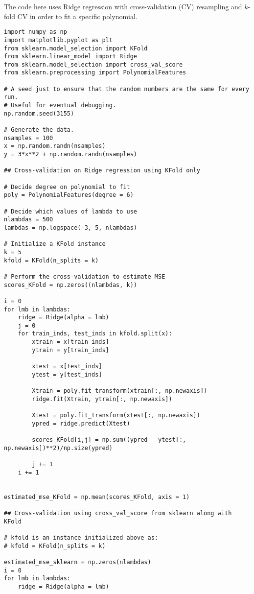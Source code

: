 \documentclass[%
oneside,                 %
final,                   %
10pt]{article}
\begin{document}
The code here uses Ridge regression with cross-validation (CV)  resampling and $k$-fold CV in order to fit a specific polynomial. 
\begin{verbatim}
import numpy as np
import matplotlib.pyplot as plt
from sklearn.model_selection import KFold
from sklearn.linear_model import Ridge
from sklearn.model_selection import cross_val_score
from sklearn.preprocessing import PolynomialFeatures

# A seed just to ensure that the random numbers are the same for every run.
# Useful for eventual debugging.
np.random.seed(3155)

# Generate the data.
nsamples = 100
x = np.random.randn(nsamples)
y = 3*x**2 + np.random.randn(nsamples)

## Cross-validation on Ridge regression using KFold only

# Decide degree on polynomial to fit
poly = PolynomialFeatures(degree = 6)

# Decide which values of lambda to use
nlambdas = 500
lambdas = np.logspace(-3, 5, nlambdas)

# Initialize a KFold instance
k = 5
kfold = KFold(n_splits = k)

# Perform the cross-validation to estimate MSE
scores_KFold = np.zeros((nlambdas, k))

i = 0
for lmb in lambdas:
    ridge = Ridge(alpha = lmb)
    j = 0
    for train_inds, test_inds in kfold.split(x):
        xtrain = x[train_inds]
        ytrain = y[train_inds]

        xtest = x[test_inds]
        ytest = y[test_inds]

        Xtrain = poly.fit_transform(xtrain[:, np.newaxis])
        ridge.fit(Xtrain, ytrain[:, np.newaxis])

        Xtest = poly.fit_transform(xtest[:, np.newaxis])
        ypred = ridge.predict(Xtest)

        scores_KFold[i,j] = np.sum((ypred - ytest[:, np.newaxis])**2)/np.size(ypred)

        j += 1
    i += 1


estimated_mse_KFold = np.mean(scores_KFold, axis = 1)

## Cross-validation using cross_val_score from sklearn along with KFold

# kfold is an instance initialized above as:
# kfold = KFold(n_splits = k)

estimated_mse_sklearn = np.zeros(nlambdas)
i = 0
for lmb in lambdas:
    ridge = Ridge(alpha = lmb)


\end{verbatim}
\end{document}
